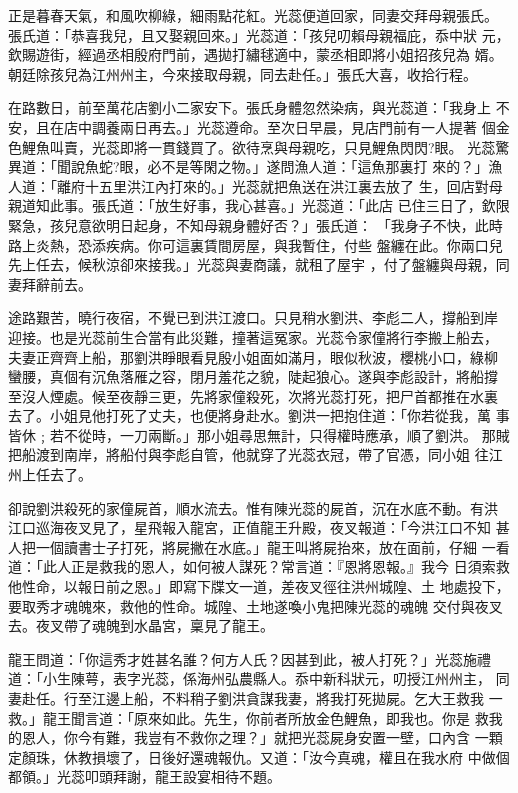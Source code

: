 \begin{pinyinscope}
{正是暮春天氣，和風吹柳綠，細雨點花紅。光蕊便道回家，同妻交拜母親張氏。
張氏道：「恭喜我兒，且又娶親回來。」光蕊道：「孩兒叨賴母親福庇，忝中狀
元，欽賜遊街，經過丞相殷府門前，遇拋打繡毬適中，蒙丞相即將小姐招孩兒為
婿。朝廷除孩兒為江州州主，今來接取母親，同去赴任。」張氏大喜，收拾行程。

在路數日，前至萬花店劉小二家安下。張氏身體忽然染病，與光蕊道：「我身上
不安，且在店中調養兩日再去。」光蕊遵命。至次日早晨，見店門前有一人提著
個金色鯉魚叫賣，光蕊即將一貫錢買了。欲待烹與母親吃，只見鯉魚閃閃?眼。
光蕊驚異道：「聞說魚蛇?眼，必不是等閑之物。」遂問漁人道：「這魚那裏打
來的？」漁人道：「離府十五里洪江內打來的。」光蕊就把魚送在洪江裏去放了
生，回店對母親道知此事。張氏道：「放生好事，我心甚喜。」光蕊道：「此店
已住三日了，欽限緊急，孩兒意欲明日起身，不知母親身體好否？」張氏道：
「我身子不快，此時路上炎熱，恐添疾病。你可這裏賃間房屋，與我暫住，付些
盤纏在此。你兩口兒先上任去，候秋涼卻來接我。」光蕊與妻商議，就租了屋宇
，付了盤纏與母親，同妻拜辭前去。

途路艱苦，曉行夜宿，不覺已到洪江渡口。只見稍水劉洪、李彪二人，撐船到岸
迎接。也是光蕊前生合當有此災難，撞著這冤家。光蕊令家僮將行李搬上船去，
夫妻正齊齊上船，那劉洪睜眼看見殷小姐面如滿月，眼似秋波，櫻桃小口，綠柳
蠻腰，真個有沉魚落雁之容，閉月羞花之貌，陡起狼心。遂與李彪設計，將船撐
至沒人煙處。候至夜靜三更，先將家僮殺死，次將光蕊打死，把尸首都推在水裏
去了。小姐見他打死了丈夫，也便將身赴水。劉洪一把抱住道：「你若從我，萬
事皆休﹔若不從時，一刀兩斷。」那小姐尋思無計，只得權時應承，順了劉洪。
那賊把船渡到南岸，將船付與李彪自管，他就穿了光蕊衣冠，帶了官憑，同小姐
往江州上任去了。

卻說劉洪殺死的家僮屍首，順水流去。惟有陳光蕊的屍首，沉在水底不動。有洪
江口巡海夜叉見了，星飛報入龍宮，正值龍王升殿，夜叉報道：「今洪江口不知
甚人把一個讀書士子打死，將屍撇在水底。」龍王叫將屍抬來，放在面前，仔細
一看道：「此人正是救我的恩人，如何被人謀死？常言道：『恩將恩報。』我今
日須索救他性命，以報日前之恩。」即寫下牒文一道，差夜叉徑往洪州城隍、土
地處投下，要取秀才魂魄來，救他的性命。城隍、土地遂喚小鬼把陳光蕊的魂魄
交付與夜叉去。夜叉帶了魂魄到水晶宮，稟見了龍王。

龍王問道：「你這秀才姓甚名誰？何方人氏？因甚到此，被人打死？」光蕊施禮
道：「小生陳萼，表字光蕊，係海州弘農縣人。忝中新科狀元，叨授江州州主，
同妻赴任。行至江邊上船，不料稍子劉洪貪謀我妻，將我打死拋屍。乞大王救我
一救。」龍王聞言道：「原來如此。先生，你前者所放金色鯉魚，即我也。你是
救我的恩人，你今有難，我豈有不救你之理？」就把光蕊屍身安置一壁，口內含
一顆定顏珠，休教損壞了，日後好還魂報仇。又道：「汝今真魂，權且在我水府
中做個都領。」光蕊叩頭拜謝，龍王設宴相待不題。

}
\end{pinyinscope}
